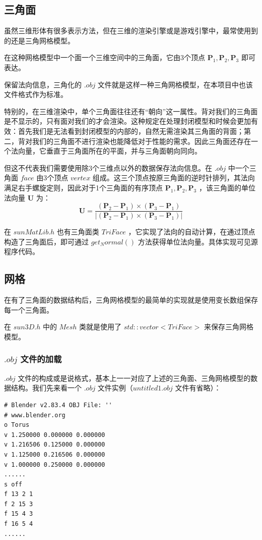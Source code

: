 \documentclass[12pt,oneside,a4paper]{ctexart}
\begin{document}
\subsection{三角面}
虽然三维形体有很多表示方法，但在三维的渲染引擎或是游戏引擎中，最常使用到的还是三角网格模型。

在这种网格模型中一个面一个三维空间中的三角面，它由3个顶点 $\mathbf{P}_1,\mathbf{P}_2, \mathbf{P}_3$ 即可表达。

保留法向信息，三角化的 $.obj$ 文件就是这样一种三角网格模型，在本项目中也该文件格式作为标准。

特别的，在三维渲染中，单个三角面往往还有“朝向”这一属性。背对我们的三角面是不显示的，只有面对我们的才会渲染。这种规定在处理封闭模型和时候会更加有效：首先我们是无法看到封闭模型的内部的，自然无需渲染其三角面的背面；第二，背对我们的三角面不进行渲染也能降低对于性能的需求。因此三角面还存在一个法向量，它垂直于三角面所在的平面，并与三角面朝向同向。

但这不代表我们需要使用除3个三维点以外的数据保存法向信息。在 $.obj$ 中一个三角面 $face$ 由3个顶点 $vertex$ 组成。这三个顶点按原三角面的逆时针排列，其法向满足右手螺旋定则，因此对于1个三角面的有序顶点 $\mathbf{P}_1,\mathbf{P}_2, \mathbf{P}_3$ ，该三角面的单位法向量 $\mathbf{U}$ 为：
\begin{equation*}
	\mathbf{U}=
	\frac{(\mathbf{P}_2 - \mathbf{P}_1)\times
		(\mathbf{P}_3 - \mathbf{P}_1)}{\left\lvert (\mathbf{P}_2 - \mathbf{P}_1)\times
		(\mathbf{P}_3 - \mathbf{P}_1)\right\rvert }
\end{equation*}

在 $sunMatLib.h$ 也有三角面类 $TriFace$ ，它实现了法向的自动计算，在通过顶点构造了三角面后，即可通过 $get_Normal()$ 方法获得单位法向量。具体实现可见源程序代码。
\subsection{网格}
在有了三角面的数据结构后，三角网格模型的最简单的实现就是使用变长数组保存每一个三角面。

在 $sun3D.h$ 中的 $Mesh$ 类就是使用了 $std::vector<TriFace>$ 来保存三角网格模型。
\subsubsection{$.obj$ 文件的加载}

$.obj$ 文件的构成或是说格式，基本上一一对应了上述的三角面、三角网格模型的数据结构。我们先来看一个  $.obj$ 文件实例（$untitled1.obj$ 文件有省略）：
\newline
\begin{lstlisting}
# Blender v2.83.4 OBJ File: ''
# www.blender.org
o Torus
v 1.250000 0.000000 0.000000
v 1.216506 0.125000 0.000000
v 1.125000 0.216506 0.000000
v 1.000000 0.250000 0.000000
......
s off
f 13 2 1
f 2 15 3
f 15 4 3
f 16 5 4
......
\end{lstlisting}
\end{document}
